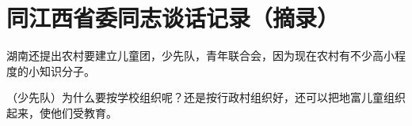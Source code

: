 \section[同江西省委同志谈话记录（摘录）（一九六四年）]{同江西省委同志谈话记录（摘录）}


湖南还提出农村要建立儿童团，少先队，青年联合会，因为现在农村有不少高小程度的小知识分子。

（少先队）为什么要按学校组织呢？还是按行政村组织好，还可以把地富儿童组织起来，使他们受教育。

